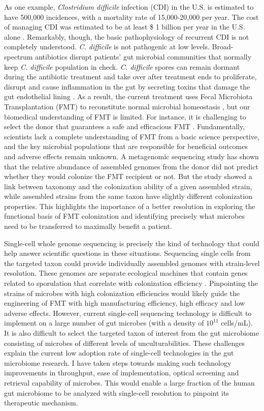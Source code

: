 As one example, \textit{Clostridium difficile} infection (CDI) in the U.S. is estimated to have 500,000 incidences, with a mortality rate of 15,000-20,000 per year. The cost of managing CDI was estimated to be at least \$ 1 billion per year in the U.S. alone \cite{Ghantoji:2010ku}. Remarkably, though, the basic pathophysiology of recurrent CDI is not completely understood. \textit{C. difficile} is not pathogenic at low levels. Broad-spectrum antibiotics disrupt patients' gut microbial communities that normally keep \textit{C. difficile} population in check. \textit{C. difficile} spores can remain dormant during the antibiotic treatment and take over after treatment ends to proliferate, disrupt and cause inflammation in the gut by secreting toxins that damage the gut endothelial lining \cite{Bakken:2011fs}. As a result, the current treatment uses Fecal Microbiota Transplantation (FMT) to reconstitute normal microbial homeostasis \cite{Kassam:2013dv}, but our biomedical understanding of FMT is limited. For instance, it is challenging to select the donor that guarantees a safe and efficacious FMT \cite{Ratner:2016dm}. Fundamentally, scientists lack a complete understanding of FMT from a basic science perspective, and the key microbial populations that are responsible for beneficial outcomes and adverse effects remain unknown. A metagenomic sequencing study \cite{Lee:2017jw} has shown that the relative abundance of assembled genomes from the donor did not predict whether they would colonize the FMT recipient or not. But the study showed a link between taxonomy and the colonization ability of a given assembled strain, while assembled strains from the same taxon have slightly different colonization properties. This highlights the importance of a better resolution in exploring the functional basis of FMT colonization and identifying precisely what microbes need to be transferred to maximally benefit a patient. 

Single-cell whole genome sequencing is precisely the kind of technology that could help answer scientific questions in these situations. Sequencing single cells from the targeted taxon could provide individually assembled genomes with strain-level resolution. These genomes are separate ecological machines that contain genes related to sporulation that correlate with colonization efficiency \cite{Nayfach:2016dm}. Pinpointing the strains of microbes with high colonization efficiencies would likely guide the engineering of FMT with high manufacturing efficiency, high efficacy and low adverse effects. However, current single-cell sequencing technology is difficult to implement on a large number of gut microbes (with a density of $10^{11}$ cells/mL). It is also difficult to select the targeted taxon of interest from the gut microbiome consisting of microbes of different levels of unculturabilities. These challenges explain the current low adoption rate of single-cell technologies in the gut microbiome research. I have taken steps towards making such technology improvements in throughput, ease of implementation, optical screening and retrieval capability of microbes. This would enable a large fraction of the human gut microbiome to be analyzed with single-cell resolution to pinpoint its therapeutic mechanism. 

